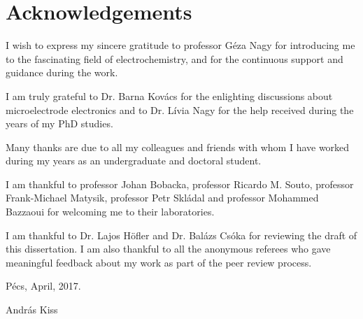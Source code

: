 \chapter*{Acknowledgements}
I wish to express my sincere gratitude to professor Géza Nagy for introducing me to the fascinating field of electrochemistry, and for the continuous support and guidance during the work. 

\vspace{5mm}

I am truly grateful to Dr. Barna Kovács for the enlighting discussions about microelectrode electronics and to Dr. Lívia Nagy for the help received during the years of my PhD studies.

\vspace{5mm}

Many thanks are due to all my colleagues and friends with whom I have worked during my years as an undergraduate and doctoral student.

\vspace{5mm}

I am thankful to professor Johan Bobacka, professor Ricardo M. Souto, professor Frank-Michael Matysik, professor Petr Skládal and professor Mohammed Bazzaoui for welcoming me to their laboratories.

\vspace{5mm}

I am thankful to Dr. Lajos Höfler and Dr. Balázs Csóka for reviewing the draft of this dissertation. I am also thankful to all the anonymous referees who gave meaningful feedback about my work as part of the peer review process.

\vspace{20mm}

Pécs, April, 2017.

\vspace{5mm}

András Kiss
